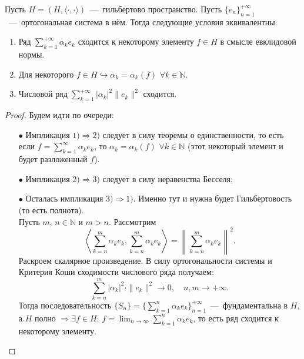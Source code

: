 \begin{theorem}
    Пусть $H = (H, \langle \cdot, \cdot \rangle)$~---~гильбертово пространство.
    Пусть $\{e_n\}_{n = 1}^{+\infty}$~---~ортогональная система в нём.
    Тогда следующие условия эквивалентны:
    \begin{enumerate}
        \item Ряд $\sum\limits_{k = 1}^{+\infty} \alpha_k e_k$ сходится к некоторому элементу $f \in H$ в смысле евклидовой нормы.
        \item Для некоторого $f \in H \hookrightarrow \alpha_k = \alpha_k(f)$ $\forall k \in \mathbb{N}$.
        \item Числовой ряд $\sum\limits_{k = 1}^{+\infty} |\alpha_k|^2\|e_k\|^2$ сходится.
    \end{enumerate}
\end{theorem}
\begin{proof}
    Будем идти по очереди:
    \begin{enumerate}
        \item[$\bullet$] Импликация $1) \Rightarrow 2)$ следует в силу теоремы о единственности, то есть если $\displaystyle f = \sum_{k=1}^{\infty}\alpha_k e_k$, то $\alpha_k = \alpha_k(f)$ $\forall k \in \mathbb{N}$ (этот некоторый элемент и будет разложенный $f$).
        \item[$\bullet$] Импликация $2) \Rightarrow 3)$ следует в силу неравенства Бесселя;
        \item[$\bullet$] Осталась импликация $3) \Rightarrow 1)$. Именно тут и нужна будет Гильбертовость (то есть полнота).\\
        Пусть $m$, $n \in \mathbb{N}$ и $m > n$.
        Рассмотрим
        \begin{equation*}
            \left\langle \sum\limits_{k = n}^{m} \alpha_k e_k, \sum\limits_{k = n}^m \alpha_k e_k \right\rangle = \left\|\sum\limits_{k = n}^m \alpha_k e_k\right\|^2.
        \end{equation*}
        Раскроем скалярное произведение. В силу ортогональности системы и Критерия Коши сходимости числового ряда получаем: $$\displaystyle \sum\limits_{k = n}^m |\alpha_k|^2 \cdot\|e_k\|^2 \rightarrow 0,\quad  n, m \rightarrow +\infty.$$
        Тогда последовательность $\displaystyle \{ S_n\} = \bigg\{ \sum_{k = 1}^{n} \alpha_k e_k\bigg\}_{n = 1}^{+\infty}$~---~фундаментальна в $H$, а $H$ полно $\Longrightarrow \exists f \in H$: $\displaystyle f = \lim_{n \to \infty} \sum_{k = 1}^{n} \alpha_k e_k$, то есть ряд сходится к некоторому элементу.
    \end{enumerate}
\end{proof}


